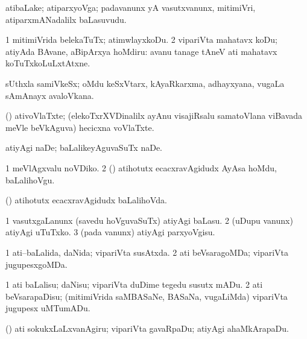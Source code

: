 \bentry
{}
\gl{\nA}
\bmng
atibaLake; atiparxyoVga; padavanunx yA vasutxvanunx, mitimiVri, atiparxmANadalilx baLasuvudu. 
\emng
\eentry

\bentry
{}
\gl{\sakirx}
\bmng
\bnum
\num{1} mitimiVrida belekaTuTx; atimwlayxkoDu. 
\num{2} vipariVta mahatavx koDu; atiyAda BAvane, aBipArxya hoMdiru:  avanu tanage tAneV ati mahatavx koTuTxkoLuLxtAtxne. 
\enum
\emng
\eentry

\bentry
{}
\gl{\nA}
\bmng
sUthxla samiVkeSx; oMdu keSxVtarx, kAyaRkarxma, adhayxyana, \mo vugaLa sAmAnayx avaloVkana. 
\emng
\eentry

\bentry
{}
\gl{\nA}
\bmng
(\viduyx) ativoVlaTxte; (elekoTxrXVDinalilx ayAnu visajiRsalu samatoVlana viBavada meVle beVkAguva) hecicxna voVlaTxte. 
\emng
\eentry

\bentry
{}
\gl{\akirx}
\bmng
atiyAgi naDe; baLalikeyAguvaSuTx naDe. 
\emng
\eentry

\bentry
{}
\gl{\sakirx}
\bmng
\bnum
\num{1} meVlAgxvalu noVDiko. 
\num{2} (\pArxparx) atihotutx ecacxravAgidudx AyAsa hoMdu, baLalihoVgu. 
\enum
\emng
\eentry

\bentry
{}
\gl{\gu}
\bmng
(\pArxparx) atihotutx ecacxravAgidudx baLalihoVda. 
\emng
\eentry

\bentry
{}
\gl{\sakirx}
\bmng
\bnum
\num{1} vasutxgaLanunx (savedu hoVguvaSuTx) atiyAgi baLasu. 
\num{2} (uDupu \mo vanunx) atiyAgi uTuTxko. 
\num{3} (pada \mo vanunx) atiyAgi parxyoVgisu. 
\enum
\emng
\eentry

\bentry
{}
\gl{\gu}
\bmng
\bnum
\num{1} ati--baLalida, daNida; vipariVta susAtxda. 
\num{2} ati beVsaragoMDa; vipariVta jugupesxgoMDa. 
\enum
\emng
\eentry

\bentry
{}
\gl{\sakirx}
\bmng
\bnum
\num{1} ati baLalisu; daNisu; vipariVta duDime tegedu susutx mADu. 
\num{2} ati beVsarapaDisu; (mitimiVrida saMBASaNe, BASaNa, \mo vugaLiMda) vipariVta jugupesx uMTumADu. 
\enum
\emng
\eentry

\bentry
{}
\gl{\akirx}
\bmng
(\pArxparx) ati sokukxLaLxvanAgiru; vipariVta gavaRpaDu; atiyAgi ahaMkArapaDu. 
\emng
\eentry

